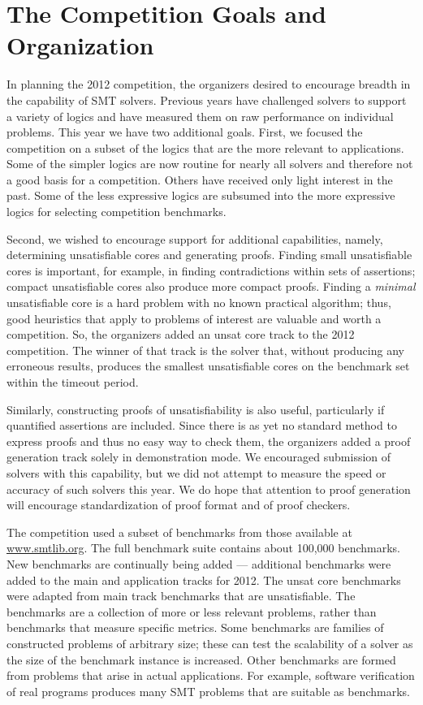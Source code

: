 \documentclass{llncs}
\begin{document}
\section{The Competition Goals and Organization}

In planning the 2012 competition, the organizers desired to encourage breadth
in the capability of SMT solvers. Previous years have challenged solvers to support a variety of logics and
have measured them on raw performance on individual problems. This year we have two additional goals. First, we
focused the competition on a subset of the logics that are the more relevant to applications. Some of the 
simpler logics are now routine for nearly all solvers and therefore not a good basis for a competition. Others have 
received only light interest in the past. Some of the less expressive logics are subsumed into the more expressive logics
for selecting competition benchmarks.

Second, we
wished to encourage support for additional capabilities, namely, determining unsatisfiable cores and generating proofs.
Finding small unsatisfiable cores is important, for example, in finding contradictions within sets of assertions; compact unsatisfiable cores also produce more compact proofs. Finding a {\em minimal} unsatisfiable core is a hard problem with no known practical algorithm;
thus, good heuristics that apply to problems of interest are valuable and worth a competition. So, the organizers added
an unsat core track to the 2012 competition. The winner of that track is the solver that, without producing any erroneous results, produces the smallest unsatisfiable cores on the benchmark set within the timeout period.

Similarly, constructing proofs of unsatisfiability is also useful, particularly if quantified assertions are included.
Since there is as yet no standard method to express proofs and thus no easy way to check them, the organizers added a proof generation track solely in demonstration mode. We encouraged submission of solvers with this capability, but we did not attempt to measure the speed or accuracy of such solvers this year. We do hope that
attention to proof generation will encourage standardization of proof format and of proof checkers.

The competition used a subset of benchmarks from those available at \url{www.smtlib.org}. The full benchmark suite contains about 100,000 benchmarks. New benchmarks are continually being added --- additional benchmarks were added to the main and application tracks for 2012. The unsat core benchmarks were adapted from main track benchmarks that are unsatisfiable. The benchmarks are a collection of more or less relevant problems, rather than benchmarks that measure specific metrics.
Some benchmarks are families of constructed problems of arbitrary size; these can test the scalability of a solver as
the size of the benchmark instance is increased. Other benchmarks are formed from problems that arise in actual 
applications. For example, software verification of real programs produces many SMT problems that are suitable as benchmarks.
\end{document}
